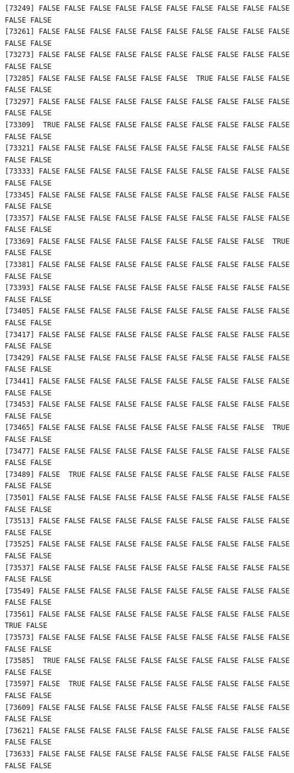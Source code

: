 \documentclass[
  a4paper,
  DIV=11,
  numbers=noendperiod]{scrartcl}
\begin{document}
\begin{verbatim}
[73249] FALSE FALSE FALSE FALSE FALSE FALSE FALSE FALSE FALSE FALSE FALSE FALSE
[73261] FALSE FALSE FALSE FALSE FALSE FALSE FALSE FALSE FALSE FALSE FALSE FALSE
[73273] FALSE FALSE FALSE FALSE FALSE FALSE FALSE FALSE FALSE FALSE FALSE FALSE
[73285] FALSE FALSE FALSE FALSE FALSE FALSE  TRUE FALSE FALSE FALSE FALSE FALSE
[73297] FALSE FALSE FALSE FALSE FALSE FALSE FALSE FALSE FALSE FALSE FALSE FALSE
[73309]  TRUE FALSE FALSE FALSE FALSE FALSE FALSE FALSE FALSE FALSE FALSE FALSE
[73321] FALSE FALSE FALSE FALSE FALSE FALSE FALSE FALSE FALSE FALSE FALSE FALSE
[73333] FALSE FALSE FALSE FALSE FALSE FALSE FALSE FALSE FALSE FALSE FALSE FALSE
[73345] FALSE FALSE FALSE FALSE FALSE FALSE FALSE FALSE FALSE FALSE FALSE FALSE
[73357] FALSE FALSE FALSE FALSE FALSE FALSE FALSE FALSE FALSE FALSE FALSE FALSE
[73369] FALSE FALSE FALSE FALSE FALSE FALSE FALSE FALSE FALSE  TRUE FALSE FALSE
[73381] FALSE FALSE FALSE FALSE FALSE FALSE FALSE FALSE FALSE FALSE FALSE FALSE
[73393] FALSE FALSE FALSE FALSE FALSE FALSE FALSE FALSE FALSE FALSE FALSE FALSE
[73405] FALSE FALSE FALSE FALSE FALSE FALSE FALSE FALSE FALSE FALSE FALSE FALSE
[73417] FALSE FALSE FALSE FALSE FALSE FALSE FALSE FALSE FALSE FALSE FALSE FALSE
[73429] FALSE FALSE FALSE FALSE FALSE FALSE FALSE FALSE FALSE FALSE FALSE FALSE
[73441] FALSE FALSE FALSE FALSE FALSE FALSE FALSE FALSE FALSE FALSE FALSE FALSE
[73453] FALSE FALSE FALSE FALSE FALSE FALSE FALSE FALSE FALSE FALSE FALSE FALSE
[73465] FALSE FALSE FALSE FALSE FALSE FALSE FALSE FALSE FALSE  TRUE FALSE FALSE
[73477] FALSE FALSE FALSE FALSE FALSE FALSE FALSE FALSE FALSE FALSE FALSE FALSE
[73489] FALSE  TRUE FALSE FALSE FALSE FALSE FALSE FALSE FALSE FALSE FALSE FALSE
[73501] FALSE FALSE FALSE FALSE FALSE FALSE FALSE FALSE FALSE FALSE FALSE FALSE
[73513] FALSE FALSE FALSE FALSE FALSE FALSE FALSE FALSE FALSE FALSE FALSE FALSE
[73525] FALSE FALSE FALSE FALSE FALSE FALSE FALSE FALSE FALSE FALSE FALSE FALSE
[73537] FALSE FALSE FALSE FALSE FALSE FALSE FALSE FALSE FALSE FALSE FALSE FALSE
[73549] FALSE FALSE FALSE FALSE FALSE FALSE FALSE FALSE FALSE FALSE FALSE FALSE
[73561] FALSE FALSE FALSE FALSE FALSE FALSE FALSE FALSE FALSE FALSE  TRUE FALSE
[73573] FALSE FALSE FALSE FALSE FALSE FALSE FALSE FALSE FALSE FALSE FALSE FALSE
[73585]  TRUE FALSE FALSE FALSE FALSE FALSE FALSE FALSE FALSE FALSE FALSE FALSE
[73597] FALSE  TRUE FALSE FALSE FALSE FALSE FALSE FALSE FALSE FALSE FALSE FALSE
[73609] FALSE FALSE FALSE FALSE FALSE FALSE FALSE FALSE FALSE FALSE FALSE FALSE
[73621] FALSE FALSE FALSE FALSE FALSE FALSE FALSE FALSE FALSE FALSE FALSE FALSE
[73633] FALSE FALSE FALSE FALSE FALSE FALSE FALSE FALSE FALSE FALSE FALSE FALSE

\end{verbatim}
\end{document}
